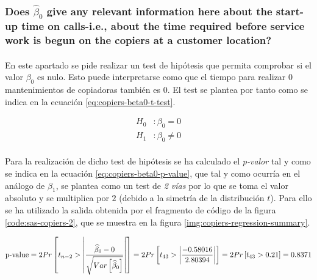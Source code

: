\documentclass{article}
\begin{document}
      \subsubsection{Does $\widehat{\beta}_0$ give any relevant information here about the start-up time on calls-i.e., about the time required before service work is begun on the copiers at a customer location?}
      \label{sec:copiers-2.5e}

        \paragraph{}
        En este apartado se pide realizar un test de hipótesis que permita comprobar si el valor $\beta_0$ es nulo. Esto puede interpretarse como que el tiempo para realizar $0$ mantenimientos de copiadoras también es $0$. El test se plantea por tanto como se indica en la ecuación \eqref{eq:copiers-beta0-t-test}.

        \begin{equation}
          \label{eq:copiers-beta0-t-test}
          \begin{split}
            H_0&: \beta_0 = 0 \\
            H_1&: \beta_0 \neq 0
          \end{split}
        \end{equation}

        \paragraph{}
        Para la realización de dicho test de hipótesis se ha calculado el \emph{p-valor} tal y como se indica en la ecuación \eqref{eq:copiers-beta0-p-value}, que tal y como ocurría en el análogo de $\beta_1$, se plantea como un test de \emph{2 vías} por lo que se toma el valor absoluto y se multiplica por $2$ (debido a la simetría de la distribución $t$). Para ello se ha utilizado la salida obtenida por el fragmento de código de la figura \ref{code:sas-copiers-2}, que se muestra en la figura \ref{img:copiers-regression-summary}.

        \begin{equation}
          \label{eq:copiers-beta0-p-value}
            \text{p-value}
            = 2Pr\left[t_{n-2} > \left|\frac{\widehat{\beta}_0 - 0}{\sqrt{Var\left[\widehat{\beta}_0\right]}}\right|\right]
            = 2Pr\left[t_{43} > \left|\frac{-0.58016}{2.80394}\right|\right]
            = 2Pr\left[t_{43} > 0.21\right]
            = 0.8371
        \end{equation}
\end{document}
